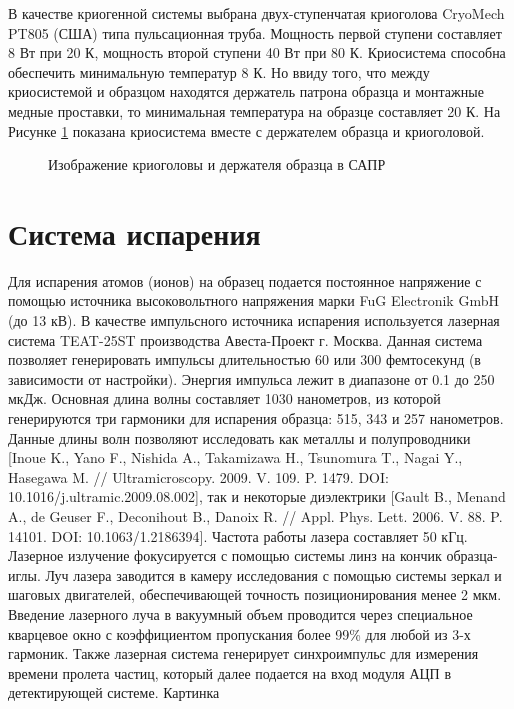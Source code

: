 \FloatBarrier
В качестве криогенной системы выбрана двух-ступенчатая криоголова CryoMech PT805 (США)  типа пульсационная труба. Мощность первой ступени составляет 8 Вт при 20 К, мощность второй ступени 40 Вт при 80 К. Криосистема способна обеспечить минимальную температур 8 К. Но ввиду того, что между криосистемой и образцом находятся держатель патрона образца и монтажные медные проставки, то минимальная температура на образце составляет 20 К. На Рисунке \cref{fig:APPLE_cryosystem} показана криосистема вместе с держателем образца и криоголовой.

\begin{figure}[htb]
	\caption{Изображение криоголовы и держателя образца в САПР}
	\label{fig:APPLE_cryosystem}
\end{figure}

\FloatBarrier

\section{Система испарения}\label{sec:ch2/sec3}



Для испарения атомов (ионов) на образец подается постоянное напряжение с помощью источника высоковольтного напряжения марки FuG Electronik GmbH (до 13 кВ). В качестве импульсного источника испарения используется лазерная система TEAT-25ST производства Авеста-Проект г. Москва. Данная система позволяет генерировать импульсы длительностью 60 или 300 фемтосекунд (в зависимости от настройки). Энергия импульса лежит в диапазоне от 0.1 до 250 мкДж. Основная длина волны составляет 1030 нанометров, из которой генерируются три гармоники для испарения образца: 515, 343 и 257 нанометров. Данные длины волн позволяют исследовать как металлы и полупроводники [Inoue K., Yano F., Nishida A., Takamizawa H., Tsunomura T., Nagai Y., Hasegawa M. // Ultramicroscopy. 2009. V. 109. P. 1479. DOI: 10.1016/j.ultramic.2009.08.002], так и некоторые диэлектрики [Gault B., Menand A., de Geuser F., Deconihout B., Danoix R. // Appl. Phys. Lett. 2006. V. 88. P. 14101. DOI: 10.1063/1.2186394]. Частота работы лазера составляет 50 кГц. Лазерное излучение фокусируется с помощью системы линз на кончик образца-иглы. Луч лазера заводится в камеру исследования с помощью системы зеркал и шаговых двигателей, обеспечивающей точность позиционирования менее 2 мкм. Введение лазерного луча в вакуумный объем проводится через специальное кварцевое окно с коэффициентом пропускания более 99\% для любой из 3-х гармоник. Также лазерная система генерирует синхроимпульс для измерения времени пролета частиц, который далее подается на вход модуля АЦП в детектирующей системе.
 Картинка
 
